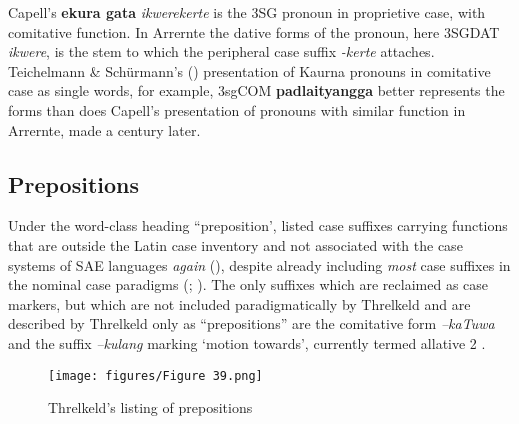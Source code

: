 
Capell’s \textbf{ekura gata} \textit{ikwerekerte} is the 3SG pronoun in proprietive case, with comitative function. In Arrernte the dative forms of the pronoun, here 3SGDAT \textit{ikwere}, is the stem to which the peripheral case suffix \textit{-kerte} attaches. Teichelmann \& Schürmann’s (\citeyear[8]{teichelmann_outlines_1840}) presentation of Kaurna pronouns in comitative case as single words, for example, 3sgCOM \textbf{padlaityangga} better represents the forms than does Capell’s presentation of pronouns with similar function in Arrernte, made a century later. 

\subsection{Prepositions}
\label{sec:key:3.3.4}

Under the word-class heading “preposition’, \citet[77]{threlkeld_australian_1834} listed case suffixes carrying functions that are outside the Latin case inventory and not associated with the case systems of SAE languages \textit{again} (), despite already including \textit{most} case suffixes in the nominal case paradigms (\citeyear[13--16]{threlkeld_australian_1834}; ). The only suffixes which are reclaimed as case markers, but which are not included paradigmatically by Threlkeld and are described by Threlkeld only as “prepositions” are the comitative form \textit{–kaTuwa} and the suffix \textit{–kulang} marking `motion towards', currently termed allative 2 \citep[30]{lissarrague_salvage_2006}.

\begin{figure}
\texttt{[image: figures/Figure 39.png]}
\caption{\label{fig:3:39} Threlkeld’s listing of prepositions \citeyearpar[77]{threlkeld_australian_1834} }
\end{figure}


